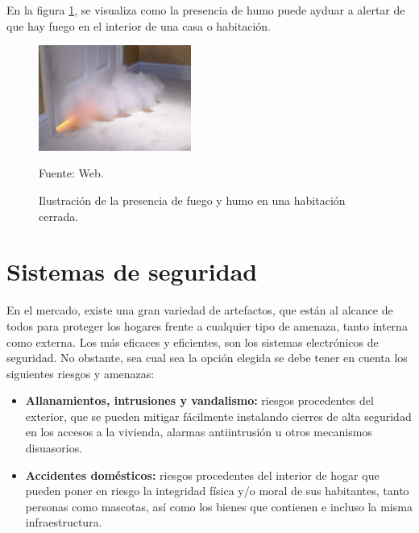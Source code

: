 En la figura \ref{fig:humo}, se visualiza como la presencia de humo puede ayduar a alertar de que hay fuego en el interior de una casa o habitación.

\begin{figure}[H]
    \begin{center}
        \includegraphics[width=5cm]{img/capitulo_3/fuego_en_el_cuarto.jpg}
        \caption{Ilustración de la presencia de fuego y humo en una habitación cerrada.}
        Fuente: Web.
        \label{fig:humo}
    \end{center}
\end{figure}


\section{Sistemas de seguridad}
En el mercado, existe una gran variedad de artefactos, que están al alcance de todos para proteger los hogares frente a cualquier tipo de amenaza, tanto interna como externa. Los más eficaces y eficientes, son los sistemas electrónicos de seguridad. No obstante, sea cual sea la opción elegida se debe tener en cuenta los siguientes riesgos y amenazas:\\

\begin{itemize}
    \item \textbf{Allanamientos, intrusiones y vandalismo:} riesgos procedentes del exterior, que se pueden mitigar fácilmente instalando cierres de alta seguridad en los accesos a la vivienda, alarmas antiintrusión u otros mecanismos disuasorios.
    \item \textbf{Accidentes domésticos:} riesgos procedentes del interior de hogar que pueden poner en riesgo la integridad física y/o moral de sus habitantes, tanto personas como mascotas, así como los bienes que contienen e incluso la misma infraestructura.
\end{itemize}

